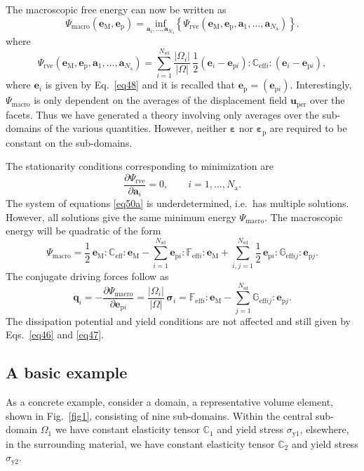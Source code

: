 \documentclass[final,1p,times]{elsarticle}
\newcommand{\beps}{\boldsymbol{\varepsilon}}
\newcommand{\bfsigma}{\boldsymbol{\sigma}}
\newcommand{\bepsp}{\boldsymbol{\varepsilon}_\mathrm{p}}
\newcommand{\be}{\begin{equation}}
\newcommand{\ee}{\end{equation}}
\newcommand{\bfm}[1]{ \mathbf{#1} }
\newcommand{\infr}[2]{
\underset{#1}{\mathrm{inf}}\left\lbrace #2 \right\rbrace
}
\begin{document}
The macroscopic free energy can now be written as
\be
\label{eq49a}
\Psi_\mathrm{macro}(\bfm{e}_\mathrm{M},\bfm{e}_{\mathrm{p}} ) =
\infr{\bfm{a}_i,\ldots,\bfm{a}_{N_\mathrm{a}}}
{\Psi_\mathrm{rve}(\bfm{e}_\mathrm{M},\bfm{e}_{\mathrm{p}},\bfm{a}_1,\ldots,\bfm{a}_{N_\mathrm{a}} )}{}.
\ee
where
\be
\label{eq50}
\Psi_\mathrm{rve}(\bfm{e}_\mathrm{M},\bfm{e}_{\mathrm{p}},\bfm{a}_1,\ldots,\bfm{a}_{N_\mathrm{a}} ) =
\sum_{i=1}^{N_\mathrm{sd}} \frac{|\Omega_i|}{|\Omega|} \, \frac{1}{2} \left( \bfm{e}_i - \bfm{e}_{\mathrm{p}i} \right) : \mathbb{C}_{\mathrm{eff}i} : \left( \bfm{e}_i - \bfm{e}_{\mathrm{p}i} \right),
\ee
where $\bfm{e}_i$ is given by Eq.~\eqref{eq48} and it is recalled that $\bfm{e}_\mathrm{p} = (\bfm{e}_{\mathrm{p}i})$.
Interestingly, $\Psi_\mathrm{macro}$ is only dependent on the averages of the displacement field $\bfm{u}_\mathrm{per}$ over the facets. Thus we have generated a theory involving only averages over the sub-domains of the various quantities. However, neither $\beps$ nor $\bepsp$ are required to be constant on the sub-domains.

The stationarity conditions corresponding to minimization are
\be
\label{eq50a}
\frac{\partial \Psi_\mathrm{rve}}{\partial \bfm{a}_i} =0, \qquad i=1,\ldots,N_\mathrm{a}.
\ee
The system of equations \eqref{eq50a} is underdetermined, i.e.\ has multiple solutions. However, all solutions give the same minimum energy $\Psi_\mathrm{macro}$. The macroscopic energy will be quadratic of the form
\be
\label{eq50b}
\Psi_\mathrm{macro} = \frac{1}{2} \, \bfm{e}_\mathrm{M}:\mathbb{C}_\mathrm{eff}:\bfm{e}_\mathrm{M} - \sum_{i=1}^{N_\mathrm{sd}} \bfm{e}_{\mathrm{p}i}:\mathbb{F}_{\mathrm{eff}i}:\bfm{e}_\mathrm{M} + \sum_{i,j=1}^{N_\mathrm{sd}} \frac{1}{2} \, \bfm{e}_{\mathrm{p}i}:\mathbb{G}_{\mathrm{eff}ij}:\bfm{e}_{\mathrm{p}j}.
\ee
The conjugate driving forces follow as
\be
\label{eq50c}
\bfm{q}_i = -\frac{\partial \Psi_\mathrm{macro}}{\partial \bfm{e}_{\mathrm{p}i}} = \frac{|\Omega_i|}{|\Omega|} \, \bfsigma_i = \mathbb{F}_{\mathrm{eff}i}:\bfm{e}_\mathrm{M} - \sum_{j=1}^{N_\mathrm{sd}} \mathbb{G}_{\mathrm{eff}ij}:\bfm{e}_{\mathrm{p}j}.
\ee
The dissipation potential and yield conditions are not affected and still given by Eqs.\  \eqref{eq46} and \eqref{eq47}.

\subsection{A basic example}

As a concrete example, consider  a domain, a representative volume element, shown in Fig.~\ref{fig1}, consisting of nine sub-domains. Within the central sub-domain $\Omega_1$ we have constant elasticity tensor $\mathbb{C}_{1}$ and yield stress $\sigma_\mathrm{y1}$, elsewhere, in the surrounding material, we have constant elasticity tensor $\mathbb{C}_{2}$ and yield stress $\sigma_\mathrm{y2}$.
\end{document}

